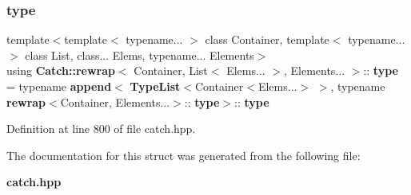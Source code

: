 \subsubsection{type}
{\footnotesize\ttfamily template$<$template$<$ typename... $>$ class Container, template$<$ typename... $>$ class List, class... Elems, typename... Elements$>$ \\
using \textbf{ Catch\+::rewrap}$<$ Container, List$<$ Elems... $>$, Elements... $>$\+::\textbf{ type} =  typename \textbf{ append}$<$\textbf{ Type\+List}$<$Container$<$Elems...$>$ $>$, typename \textbf{ rewrap}$<$Container, Elements...$>$\+::\textbf{ type}$>$\+::\textbf{ type}}



Definition at line 800 of file catch.\+hpp.



The documentation for this struct was generated from the following file\+:\begin{DoxyCompactItemize}
\item 
\textbf{ catch.\+hpp}\end{DoxyCompactItemize}
